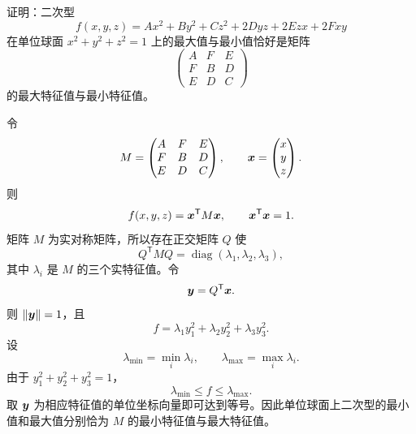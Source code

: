 \begin{xreferenceproblem}[8]
证明：二次型
  \[
    f(x,y,z)=Ax^2+By^2+Cz^2+2Dyz+2Ezx+2Fxy
  \]
  在单位球面 $x^2+y^2+z^2=1$ 上的最大值与最小值恰好是矩阵
  \[
    \begin{pmatrix}A&F&E\\F&B&D\\E&D&C\end{pmatrix}
  \]
  的最大特征值与最小特征值。
\end{xreferenceproblem}
\begin{xsolution}
令
\[
  M=\begin{pmatrix}
  A&F&E\\
  F&B&D\\
  E&D&C
  \end{pmatrix},
  \qquad
  \bm{x}=\begin{pmatrix}x\\y\\z\end{pmatrix}.
\]
则
\[
  f(x,y,z)=\bm{x}^{\mathsf T}M\bm{x},
  \qquad
  \bm{x}^{\mathsf T}\bm{x}=1.
\]
矩阵 $M$ 为实对称矩阵，所以存在正交矩阵 $Q$ 使
\[
  Q^{\mathsf T}MQ
  =\operatorname{diag}(\lambda_1,\lambda_2,\lambda_3),
\]
其中 $\lambda_i$ 是 $M$ 的三个实特征值。令
\[
  \bm{y}=Q^{\mathsf T}\bm{x}.
\]
则 $\lVert\bm{y}\rVert=1$，且
\[
  f=\lambda_1y_1^2+\lambda_2y_2^2+\lambda_3y_3^2.
\]
设
\[
  \lambda_{\min}=\min_i\lambda_i,
  \qquad
  \lambda_{\max}=\max_i\lambda_i.
\]
由于 $y_1^2+y_2^2+y_3^2=1$，
\[
  \lambda_{\min}\le f\le\lambda_{\max}.
\]
取 $\bm{y}$ 为相应特征值的单位坐标向量即可达到等号。因此单位球面上二次型的最小值和最大值分别恰为 $M$ 的最小特征值与最大特征值。
\end{xsolution}


